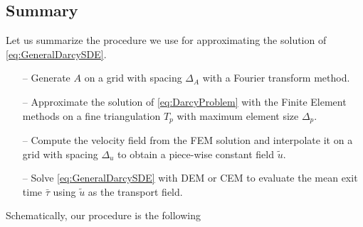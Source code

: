 \subsection{Summary}

Let us summarize the procedure we use for approximating the solution of \eqref{eq:GeneralDarcySDE}. 
\begin{itemize}
	\item[--] Generate $A$ on a grid with spacing $\Delta_A$ with a Fourier transform method.
	\item[--] Approximate the solution of \eqref{eq:DarcyProblem} with the Finite Element methods on a fine triangulation $T_p$ with maximum element size $\Delta_p$.
	\item[--] Compute the velocity field from the FEM solution and interpolate it on a grid with spacing $\Delta_u$ to obtain a piece-wise constant field $\tilde{u}$.
	\item[--] Solve \eqref{eq:GeneralDarcySDE} with DEM or CEM to evaluate the mean exit time $\bar\tau$ using $\tilde{u}$ as the transport field.
\end{itemize}
Schematically, our procedure is the following
\begin{center}
\end{center}
